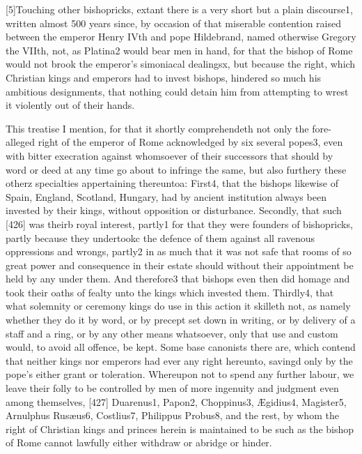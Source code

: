 [5]Touching other bishopricks, extant there is a very short but a plain discourse1, written almost 500 years since, by occasion of that miserable contention raised between the emperor Henry IVth and pope Hildebrand, named otherwise Gregory the VIIth, not, as Platina2 would bear men in hand, for that the bishop of Rome would not brook the emperor’s simoniacal dealingsx, but because the right, which Christian kings and emperors had to invest bishops, hindered so much his ambitious designments, that nothing could detain him from attempting to wrest it violently out of their hands.

This treatise I mention, for that it shortly comprehendeth not only the fore-alleged right of the emperor of Rome acknowledged by six several popes3, even with bitter execration against whomsoever of their successors that should by word or deed at any time go about to infringe the same, but also furthery these otherz specialties appertaining thereuntoa: First4, that the bishops likewise of Spain, England, Scotland, Hungary, had by ancient institution always been invested by their kings, without opposition or disturbance. Secondly, that such [426] was theirb royal interest, partly1 for that they were founders of bishopricks, partly because they undertookc the defence of them against all ravenous oppressions and wrongs, partly2 in as much that it was not safe that rooms of so great power and consequence in their estate should without their appointment be held by any under them. And therefore3 that bishops even then did homage and took their oaths of fealty unto the kings which invested them. Thirdly4, that what solemnity or ceremony kings do use in this action it skilleth not, as namely whether they do it by word, or by precept set down in writing, or by delivery of a staff and a ring, or by any other means whatsoever, only that use and custom would, to avoid all offence, be kept. Some base canonists there are, which contend that neither kings nor emperors had ever any right hereunto, savingd only by the pope’s either grant or toleration. Whereupon not to spend any further labour, we leave their folly to be controlled by men of more ingenuity and judgment even among themselves, [427] Duarenus1, Papon2, Choppinus3, Ægidius4, Magister5, Arnulphus Rusæus6, Costlius7, Philippus Probus8, and the rest, by whom the right of Christian kings and princes herein is maintained to be such as the bishop of Rome cannot lawfully either withdraw or abridge or hinder.

